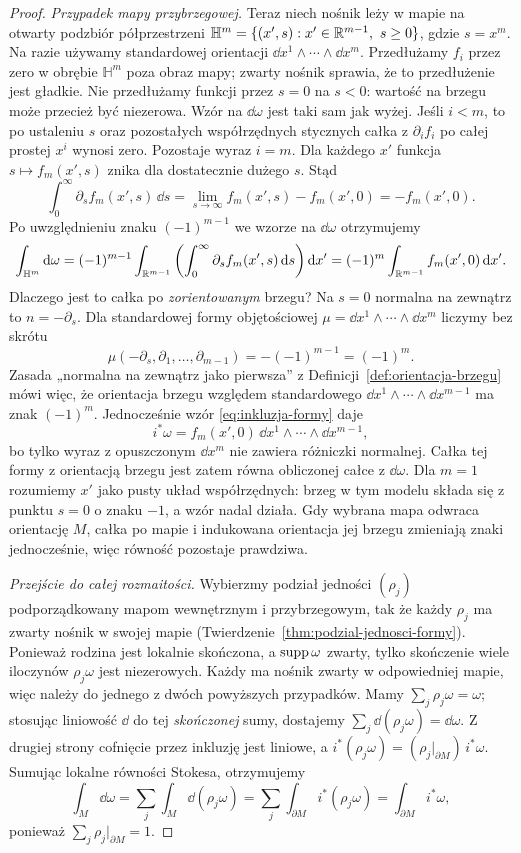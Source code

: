 \begin{proof}
\emph{Przypadek mapy przybrzegowej.}
Teraz niech nośnik leży w mapie na otwarty
podzbiór półprzestrzeni
$\mathbb H^m=\{(x',s):x'\in\R^{m-1},\ s\geq0\}$,
gdzie $s=x^m$. Na razie używamy standardowej
orientacji $\dd x^1\wedge\cdots\wedge\dd x^m$.
Przedłużamy $f_i$ przez zero w obrębie
$\mathbb H^m$ poza obraz mapy; zwarty nośnik
sprawia, że to przedłużenie jest gładkie.
Nie przedłużamy funkcji przez $s=0$ na $s<0$:
wartość na brzegu może przecież być niezerowa.
Wzór na $\dd\omega$ jest taki sam jak wyżej.
Jeśli $i<m$, to po ustaleniu $s$ oraz pozostałych
współrzędnych stycznych całka z $\partial_i f_i$
po całej prostej $x^i$ wynosi zero.
Pozostaje wyraz $i=m$. Dla każdego $x'$ funkcja
$s\mapsto f_m(x',s)$ znika dla dostatecznie
dużego $s$. Stąd
\[
 \int_0^\infty\partial_s f_m(x',s)\,\dd s
 =\lim_{s\to\infty}f_m(x',s)-f_m(x',0)
 =-f_m(x',0).
\]
Po uwzględnieniu znaku $(-1)^{m-1}$ we wzorze
na $\dd\omega$ otrzymujemy
\[
 \int_{\mathbb H^m}\mathrm d\omega
 =(-1)^{m-1}\int_{\mathbb{R}^{m-1}}
  \left(\int_0^\infty\partial_s f_m(x',s)\,\mathrm d s\right)
          \mathrm d x'
 =(-1)^m\int_{\mathbb{R}^{m-1}} f_m(x',0)\,\mathrm d x'.
\]
Dlaczego jest to całka po \emph{zorientowanym}
brzegu? Na $s=0$ normalna na zewnątrz to
$n=-\partial_s$. Dla standardowej formy
objętościowej $\mu=\dd x^1\wedge\cdots\wedge\dd x^m$
liczymy bez skrótu
\[
 \mu(-\partial_s,\partial_1,\ldots,\partial_{m-1})
 =-(-1)^{m-1}=(-1)^m.
\]
Zasada „normalna na zewnątrz jako pierwsza”
z Definicji~\ref{def:orientacja-brzegu} mówi więc,
że orientacja brzegu względem standardowego
$\dd x^1\wedge\cdots\wedge\dd x^{m-1}$
ma znak $(-1)^m$. Jednocześnie wzór
\eqref{eq:inkluzja-formy} daje
\[
 i^*\omega=f_m(x',0)\,
 \dd x^1\wedge\cdots\wedge\dd x^{m-1},
\]
bo tylko wyraz z opuszczonym $\dd x^m$
nie zawiera różniczki normalnej. Całka tej
formy z orientacją brzegu jest zatem równa
obliczonej całce z $\dd\omega$.
Dla $m=1$ rozumiemy $x'$ jako pusty układ
współrzędnych: brzeg w tym modelu składa się
z punktu $s=0$ o znaku $-1$, a wzór nadal działa.
Gdy wybrana mapa odwraca orientację $M$,
całka po mapie i indukowana orientacja jej brzegu
zmieniają znaki jednocześnie, więc równość
pozostaje prawdziwa.

\emph{Przejście do całej rozmaitości.}
Wybierzmy podział jedności $(\rho_j)$
podporządkowany mapom wewnętrznym i przybrzegowym,
tak że każdy $\rho_j$ ma zwarty nośnik w swojej
mapie (Twierdzenie~\ref{thm:podzial-jednosci-formy}).
Ponieważ rodzina jest lokalnie skończona, a
$\operatorname{supp}\omega$ zwarty, tylko skończenie wiele
iloczynów $\rho_j\omega$ jest niezerowych.
Każdy ma nośnik zwarty w odpowiedniej mapie,
więc należy do jednego z dwóch powyższych
przypadków. Mamy $\sum_j\rho_j\omega=\omega$;
stosując liniowość $\dd$ do tej \emph{skończonej}
sumy, dostajemy $\sum_j\dd(\rho_j\omega)=\dd\omega$.
Z drugiej strony cofnięcie przez inkluzję jest
liniowe, a $i^*(\rho_j\omega)
=(\rho_j|_{\partial M})\,i^*\omega$.
Sumując lokalne równości Stokesa, otrzymujemy
\[
 \int_M\dd\omega
 =\sum_j\int_M\dd(\rho_j\omega)
 =\sum_j\int_{\partial M}i^*(\rho_j\omega)
 =\int_{\partial M}i^*\omega,
\]
ponieważ $\sum_j\rho_j|_{\partial M}=1$.
\end{proof}

